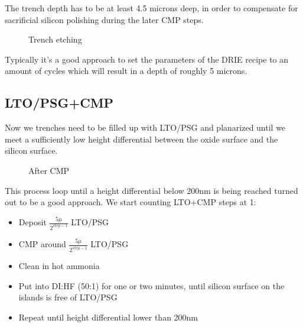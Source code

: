 The trench depth has to be at least 4.5 microns deep, in order to compensate for sacrificial silicon polishing during the later CMP steps.

\begin{figure}[H]
	\centering
	\begin{tikzpicture}[node distance = 3cm, auto, thick,scale=\CrossSectionOnly, every node/.style={transform shape}]
		
	\end{tikzpicture}
	\drawStepArrow{}
	\begin{tikzpicture}[node distance = 3cm, auto, thick,scale=\CrossSectionOnly, every node/.style={transform shape}]
		
	\end{tikzpicture}
	\caption{Trench etching}
\end{figure}

Typically it's a good approach to set the parameters of the DRIE recipe to an amount of cycles which will result in a depth of roughly 5 microns.

\subsection{LTO/PSG+CMP}

Now we trenches need to be filled up with LTO/PSG and planarized until we meet a sufficiently low height differential between the oxide surface and the silicon surface.

\begin{figure}[H]
	\centering
	\begin{tikzpicture}[node distance = 3cm, auto, thick,scale=\CrossSectionOnly, every node/.style={transform shape}]
		
	\end{tikzpicture}
	\drawStepArrow{}
	\begin{tikzpicture}[node distance = 3cm, auto, thick,scale=\CrossSectionOnly, every node/.style={transform shape}]
		
	\end{tikzpicture}
	\caption{After CMP}
\end{figure}

This process loop until a height differential below 200nm is being reached turned out to be a good approach. We start counting LTO+CMP steps at 1:
\begin{itemize}
\item Deposit $\frac{5\mu}{2^{step-1}}$ LTO/PSG
\item CMP around $\frac{5\mu}{2^{step-1}}$ LTO/PSG
\item Clean in hot ammonia
\item Put into DI:HF (50:1) for one or two minutes, until silicon surface on the islands is free of LTO/PSG 
\item Repeat until height differential lower than 200nm
\end{itemize}

